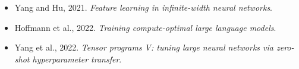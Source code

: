 \begin{frame}
{\begin{itemize}
    \item Yang and Hu, 2021. \textit{Feature learning in infinite-width neural networks}. 
    \item Hoffmann et al., 2022. \textit{Training compute-optimal large language models}. 
    \item Yang et al., 2022. \textit{Tensor programs V: tuning large neural networks via zero-shot hyperparameter transfer}.

\end{itemize}}
\end{frame}

